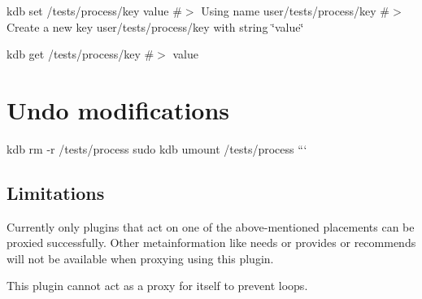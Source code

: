 kdb set /tests/process/key value \#$>$ Using name user/tests/process/key \#$>$ Create a new key user/tests/process/key with string \char`\"{}value\char`\"{}

kdb get /tests/process/key \#$>$ value

\section*{Undo modifications}

kdb rm -\/r /tests/process sudo kdb umount /tests/process ```

\subsection*{Limitations}


\begin{DoxyItemize}
\item Currently only plugins that act on one of the above-\/mentioned {\ttfamily placements} can be proxied successfully. Other metainformation like {\ttfamily needs} or {\ttfamily provides} or {\ttfamily recommends} will not be available when proxying using this plugin.
\item This plugin cannot act as a proxy for itself to prevent loops. 
\end{DoxyItemize}